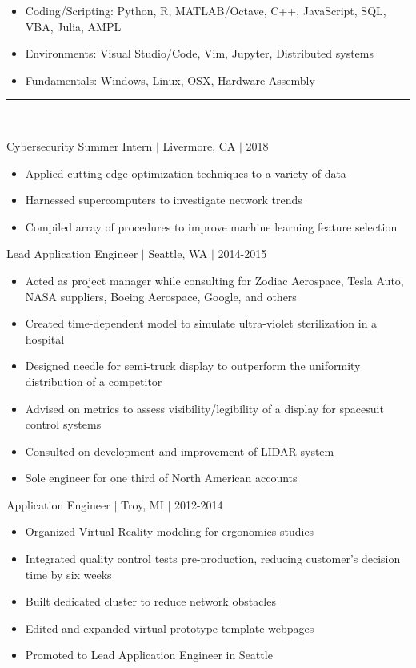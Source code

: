 \documentclass[11pt]{article}
\begin{document}
\begin{itemize}
\item Coding/Scripting: Python, R, MATLAB/Octave, C++, JavaScript, SQL, VBA, Julia, AMPL
\item Environments: Visual Studio/Code, Vim, Jupyter, Distributed systems
\item Fundamentals: Windows, Linux, OSX, Hardware Assembly
\end{itemize}

\vspace{8pt}\hrule\vspace{10pt}
\\
\vspace{-8pt}

\hfill{Cybersecurity Summer Intern $|$ Livermore, CA $|$ 2018}

\begin{itemize}
\item Applied cutting-edge optimization techniques to a variety of data
\item Harnessed supercomputers to investigate network trends
\item Compiled array of procedures to improve machine learning feature selection
\end{itemize}

\hfill { Lead Application Engineer $|$ Seattle, WA $|$ 2014-2015}

\begin{itemize}
\item Acted as project manager while consulting for Zodiac Aerospace, Tesla Auto, NASA suppliers, Boeing Aerospace, Google, and others
\item Created time-dependent model to simulate ultra-violet sterilization in a hospital
\item Designed needle for semi-truck display to outperform the uniformity distribution of a competitor
\item Advised on metrics to assess visibility/legibility of a display for spacesuit control systems
\item Consulted on development and improvement of LIDAR system
\item Sole engineer for one third of North American accounts
\end{itemize}

\hfill { Application Engineer $|$ Troy, MI $|$ 2012-2014}

\begin{itemize}
\item Organized Virtual Reality modeling for ergonomics studies
\item Integrated quality control tests pre-production, reducing customer's decision time by six weeks
\item Built dedicated cluster to reduce network obstacles
\item Edited and expanded virtual prototype template webpages
\item Promoted to Lead Application Engineer in Seattle
\end{itemize}
\end{document}
